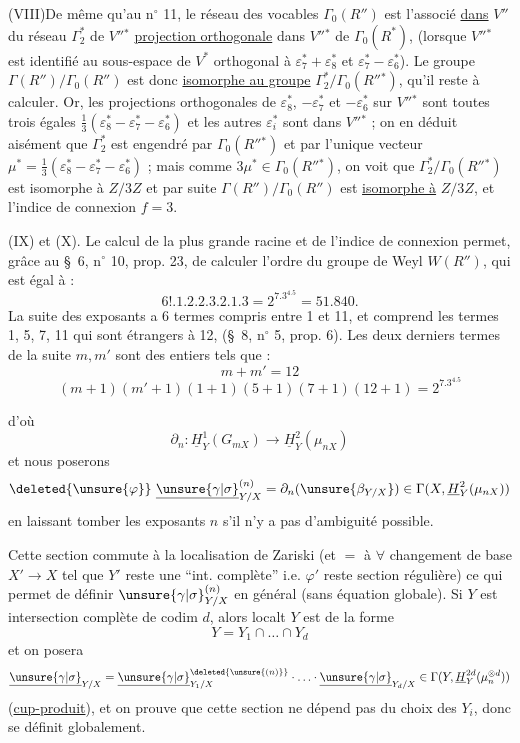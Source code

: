 (VIII)\quad De même qu'au n$^{\circ}$ 11, le réseau des vocables $\Gamma_0(R'')$ est l'associé
\uline{dans} $V''$ du réseau $\Gamma_2^*$ de $V''{}^*$ \uline{projection orthogonale} dans $V''{}^*$ de $\Gamma_0(R^*)$,
(lorsque $V''{}^*$ est identifié au sous-espace de $V^*$ orthogonal à
$\varepsilon_7^*+\varepsilon_8^*$ et $\varepsilon_7^*-\varepsilon_6^*$).
Le groupe $\Gamma(R'')/\Gamma_0(R'')$ est donc \uline{isomorphe au groupe} $\Gamma_2^*/\Gamma_0(R''{}^*)$, qu'il reste
à calculer. Or, les projections orthogonales de $\varepsilon_8^*$, $-\varepsilon_7^*$ et $-\varepsilon_6^*$ sur $V''{}^*$ sont
toutes trois égales $\frac13(\varepsilon_8^*-\varepsilon_7^*-\varepsilon_6^*)$ et les autres $\varepsilon_i^*$ sont dans $V''{}^*$ ; on en
déduit aisément que $\Gamma_2^*$ est engendré par $\Gamma_0(R''{}^*)$ et par l'unique vecteur
$\mu^*=\frac13(\varepsilon_8^*-\varepsilon_7^*-\varepsilon_6^*)$ ; mais comme $3\mu^*\in\Gamma_0(R''{}^*)$, on voit que
$\Gamma_2^*/\Gamma_0(R''{}^*)$
est isomorphe à $Z/3Z$ et par suite $\Gamma(R'')/\Gamma_0(R'')$ est \uline{isomorphe à} $Z/3Z$, et
l'indice de connexion $f=3$.

(IX) et (X). Le calcul de la plus grande racine et de l'indice de connexion
permet, grâce au \S\ 6, n$^{\circ}$ 10, prop. 23, de calculer l'ordre du groupe de Weyl
$W(R'')$, qui est égal à :
\[
6!.1.2.2.3.2.1.3=2^7.3^4.5=51.840.
\]
La suite des exposants a 6 termes compris entre 1 et 11, et comprend les termes
1, 5, 7, 11 qui sont étrangers à 12, (\S\ 8, n$^{\circ}$ 5, prop. 6). Les deux derniers
termes de la suite $m,m'$ sont des entiers tels que :
\[
m+m'=12
\]
\[
(m+1)(m'+1)(1+1)(5+1)(7+1)(12+1)=2^7.3^4.5
\]



d'où
\[
\partial_n:\underline H_Y^1(G_{mX})\longrightarrow\underline H_Y^2(\mu_{nX})
\]
et nous poserons
\[
\deleted{\unsure{\varphi}}\ 
\underline{\unsure{\gamma|\sigma}}_{Y/X}^{(n)}
=\partial_n(\unsure{\beta_{Y/X}})
\in\Gamma(X,\underline H_Y^2(\mu_{nX}))
\]
en laissant tomber les exposants $n$
s'il n'y a pas d'ambiguité possible.

Cette section  commute à la localisation
de Zariski (et $=$ à $\forall$ changement de base
$X'\longrightarrow X$ tel que $Y'$ reste une ``int. complète''
i.e. $\varphi'$ reste section régulière) ce qui
permet de définir $\unsure{\gamma|\sigma}_{Y/X}^{(n)}$ en général
(sans équation globale). Si \inserted{maintenant} $Y$ est intersection
complète de codim $d$, alors localt $Y$ est
de la forme
\[
Y=Y_1\cap\ldots\cap Y_d
\]
et on posera
\[
\underline{\unsure{\gamma|\sigma}}_{Y/X}
=\underline{\unsure{\gamma|\sigma}}_{Y_1/X}^{\deleted{\unsure{(n)}}}
\cdot\ldots\cdot\underline{\unsure{\gamma|\sigma}}_{Y_d/X}
\in\Gamma(Y,\underline H_Y^{2d}(\mu_n^{\otimes d}))
\]
(\uline{cup-produit}), et on prouve que cette
section ne dépend pas du choix des $Y_i$,
donc se définit globalement.


